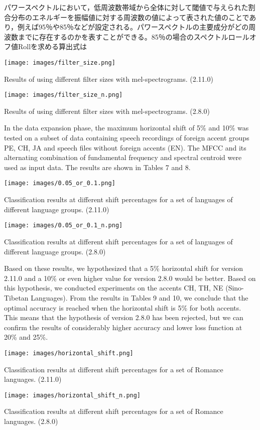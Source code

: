 パワースペクトルにおいて，低周波数帯域から全体に対して閾値で与えられた割合分布のエネルギーを振幅値に対する周波数の値によって表された値のことであり，例えば95％や85％などが設定される。パワースペクトルの主要成分がどの周波数までに存在するのかを表すことができる。85％の場合のスペクトルロールオフ値Rollを求める算出式は\documentclass[ams]{U-AizuGT}
\begin{document}
\begin{table}[h]
    \centering
    \texttt{[image: images/filter\_size.png]}
    \caption{Results of using different filter sizes with mel-spectrograms. (2.11.0)}
\end{table}
\begin{table}[h]
    \centering
    \texttt{[image: images/filter\_size\_n.png]}
    \caption{Results of using different filter sizes with mel-spectrograms. (2.8.0)}
\end{table}

In the data expansion phase, the maximum horizontal shift of 5\% and 10\% was tested on a subset of data containing speech recordings of foreign accent groups {PE, CH, JA} and speech files without foreign accents (EN). The MFCC and its alternating combination of fundamental frequency and spectral centroid were used as input data. The results are shown in Tables 7 and 8.
\begin{table}[h]
    \centering
    \texttt{[image: images/0.05\_or\_0.1.png]}
    \caption{Classification results at different shift percentages for a set of languages of different language groups. (2.11.0)}
\end{table}
\begin{table}[h]
    \centering
    \texttt{[image: images/0.05\_or\_0.1\_n.png]}
    \caption{Classification results at different shift percentages for a set of languages of different language groups. (2.8.0)}
\end{table}

Based on these results, we hypothesized that a 5\% horizontal shift for version 2.11.0 and a 10\% or even higher value for version 2.8.0 would be better. Based on this hypothesis, we conducted experiments on the accents {CH, TH, NE} (Sino-Tibetan Languages). From the results in Tables 9 and 10, we conclude that the optimal accuracy is reached when the horizontal shift is 5\% for both accents. This means that the hypothesis of version 2.8.0 has been rejected, but we can confirm the results of considerably higher accuracy and lower loss function at 20\% and 25\%.

\begin{table}[h]
    \centering
    \texttt{[image: images/horizontal\_shift.png]}
    \caption{Classification results at different shift percentages for a set of Romance languages. (2.11.0)}
\end{table}
\begin{table}[h]
    \centering
    \texttt{[image: images/horizontal\_shift\_n.png]}
    \caption{Classification results at different shift percentages for a set of Romance languages. (2.8.0)}
\end{table}
\end{document}
